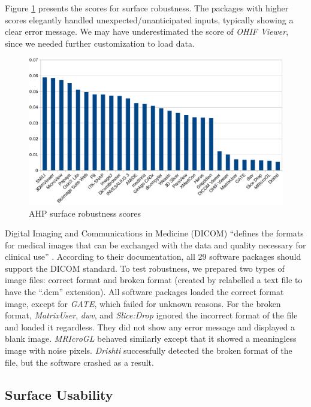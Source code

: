\documentclass[final, 3p, times, authoryear]{elsarticle}
\begin{document}
Figure \ref{fg_robustness_scores} presents the scores for surface robustness.
The packages with higher scores elegantly handled unexpected/unanticipated
inputs, typically showing a clear error message. We may have underestimated the
score of \textit{OHIF Viewer}, since we needed further customization to load
data.

\begin{figure}[!ht]
\includegraphics[scale=0.38]{figures/robustness_scores.png}
\caption{AHP surface robustness scores}
\label{fg_robustness_scores}
\end{figure}

Digital Imaging and Communications in Medicine (DICOM) ``defines the formats for
medical images that can be exchanged with the data and quality necessary for
clinical use'' \citep{MITA2021}. According to their documentation, all 29
software packages should support the DICOM standard. To test robustness, we
prepared two types of image files: correct format and broken format (created by
relabelled a text file to have the ``.dcm'' extension).  All software packages
loaded the correct format image, except for \textit{GATE}, which failed for
unknown reasons.  For the broken format, \textit{MatrixUser}, \textit{dwv}, and
\textit{Slice:Drop} ignored the incorrect format of the file and loaded it
regardless. They did not show any error message and displayed a blank image.
\textit{MRIcroGL} behaved similarly except that it showed a meaningless image
with noise pixels. \textit{Drishti} successfully detected the broken format of
the file, but the software crashed as a result.

\subsection{Surface Usability} \label{sec_result_usability}
\end{document}
